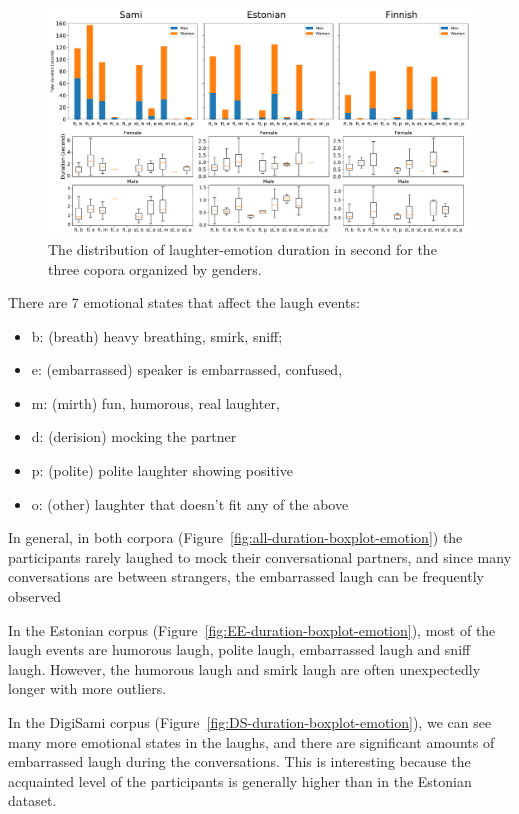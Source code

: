 \documentclass[10pt,journal,compsoc]{IEEEtran}
\begin{document}
\begin{figure}[!t]
\centering
\includegraphics[width=1\linewidth]{figures/emotion_dist.pdf}
\caption{The distribution of laughter-emotion duration in second for the three copora organized by genders.}
\label{fig:emotion-distribution}
\end{figure}


There are 7 emotional states that affect the laugh events:
\begin{itemize}
\item b: (breath) heavy breathing, smirk, sniff;
\item e: (embarrassed) speaker is embarrassed, confused,
\item m: (mirth) fun, humorous, real laughter,
\item d: (derision) mocking the partner
\item p: (polite) polite laughter showing positive
\item o: (other) laughter that doesn't fit any of the above
\end{itemize}

In general, in both corpora (Figure~\ref{fig:all-duration-boxplot-emotion}) the participants rarely laughed to mock their conversational partners, and since many conversations are between strangers, the embarrassed laugh can be frequently observed

In the Estonian corpus (Figure~\ref{fig:EE-duration-boxplot-emotion}), most of the laugh events are humorous laugh, polite laugh, embarrassed laugh and sniff laugh. However, the humorous laugh and smirk laugh are often unexpectedly longer with more outliers.

In the DigiSami corpus (Figure~\ref{fig:DS-duration-boxplot-emotion}), we can see many more emotional states in the laughs, and there are significant amounts of embarrassed laugh during the conversations. This is interesting because the acquainted level of the participants is generally higher than in the Estonian dataset.
\end{document}
